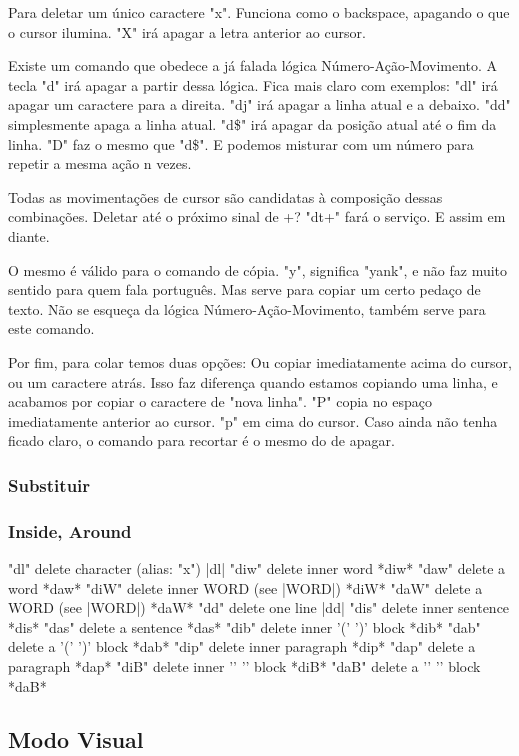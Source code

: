 \documentclass[a4paper, 12pt]{article}
\begin{document}
Para deletar um único caractere "x". Funciona como o backspace, apagando o que o cursor ilumina. "X" irá apagar a letra anterior ao cursor.

Existe um comando que obedece a já falada lógica Número-Ação-Movimento.
A tecla "d" irá apagar a partir dessa lógica.
Fica mais claro com exemplos: "dl" irá apagar um caractere para a direita.
"dj" irá apagar a linha atual e a debaixo.
"dd" simplesmente apaga a linha atual.
"d\$" irá apagar da posição atual até o fim da linha.
"D" faz o mesmo que "d\$".
E podemos misturar com um número para repetir a mesma ação n vezes.

Todas as movimentações de cursor são candidatas à composição dessas combinações.
Deletar até o próximo sinal de +? "dt+" fará o serviço.
E assim em diante.

O mesmo é válido para o comando de cópia.
"y", significa "yank", e não faz muito sentido para quem fala português. 
Mas serve para copiar um certo pedaço de texto.
Não se esqueça da lógica Número-Ação-Movimento, também serve para este comando.

Por fim, para colar temos duas opções: Ou copiar imediatamente acima do cursor, ou um caractere atrás.
Isso faz diferença quando estamos copiando uma linha, e acabamos por copiar o caractere de "nova linha".
"P" copia no espaço imediatamente anterior ao cursor. "p" em cima do cursor.
Caso ainda não tenha ficado claro, o comando para recortar é o mesmo do de apagar.




\subsubsection{Substituir}

\subsubsection{Inside, Around}
	"dl"	delete character (alias: "x")		|dl|
	"diw"	delete inner word			*diw*
	"daw"	delete a word				*daw*
	"diW"	delete inner WORD (see |WORD|)		*diW*
	"daW"	delete a WORD (see |WORD|)		*daW*
	"dd"	delete one line				|dd|
	"dis"	delete inner sentence			*dis*
	"das"	delete a sentence			*das*
	"dib"	delete inner '(' ')' block		*dib*
	"dab"	delete a '(' ')' block			*dab*
	"dip"	delete inner paragraph			*dip*
	"dap"	delete a paragraph			*dap*
	"diB"	delete inner '{' '}' block		*diB*
	"daB"	delete a '{' '}' block			*daB*
\subsection{Modo Visual}
\end{document}
